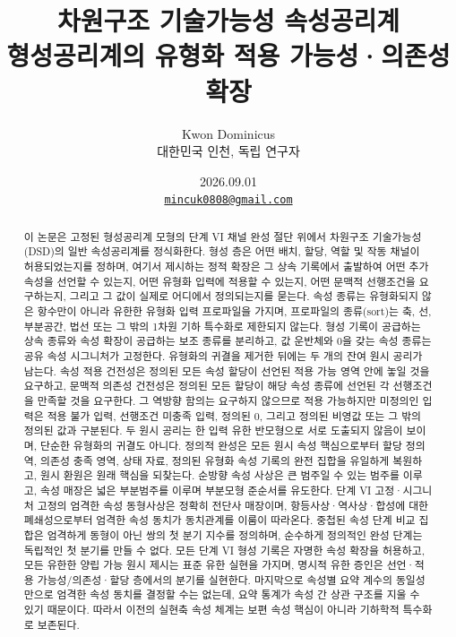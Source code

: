 \documentclass[11pt]{article}
\title{차원구조 기술가능성 속성공리계\\[0.35em]
\large 형성공리계의 유형화 적용 가능성·의존성 확장}
\author{Kwon Dominicus\\\small 대한민국 인천, 독립 연구자}
\date{2026.09.01\\[0.4em]\small\href{mailto:mincuk0808@gmail.com}{\texttt{mincuk0808@gmail.com}}}
\theoremstyle{definition}
\theoremstyle{remark}
\begin{document}
\maketitle

\begin{abstract}
이 논문은 고정된 형성공리계 모형의 단계 VI 채널 완성 절단 위에서 차원구조 기술가능성(DSD)의 일반 속성공리계를 정식화한다.
형성 층은 어떤 배치, 할당, 역할 및 작동 채널이 허용되었는지를 정하며, 여기서 제시하는 정적 확장은 그 상속 기록에서 출발하여 어떤 추가 속성을 선언할 수 있는지, 어떤 유형화 입력에 적용할 수 있는지, 어떤 문맥적 선행조건을 요구하는지, 그리고 그 값이 실제로 어디에서 정의되는지를 묻는다.
속성 종류는 유형화되지 않은 항수만이 아니라 유한한 유형화 입력 프로파일을 가지며, 프로파일의 종류(sort)는 축, 선, 부분공간, 법선 또는 그 밖의 1차원 기하 특수화로 제한되지 않는다.
형성 기록이 공급하는 상속 종류와 속성 확장이 공급하는 보조 종류를 분리하고, 값 운반체와 0을 갖는 속성 종류는 공유 속성 시그니처가 고정한다.
유형화의 귀결을 제거한 뒤에는 두 개의 잔여 원시 공리가 남는다.
속성 적용 건전성은 정의된 모든 속성 할당이 선언된 적용 가능 영역 안에 놓일 것을 요구하고, 문맥적 의존성 건전성은 정의된 모든 할당이 해당 속성 종류에 선언된 각 선행조건을 만족할 것을 요구한다.
그 역방향 함의는 요구하지 않으므로 적용 가능하지만 미정의인 입력은 적용 불가 입력, 선행조건 미충족 입력, 정의된 0, 그리고 정의된 비영값 또는 그 밖의 정의된 값과 구분된다.
두 원시 공리는 한 입력 유한 반모형으로 서로 도출되지 않음이 보이며, 단순한 유형화의 귀결도 아니다.
정의적 완성은 모든 원시 속성 핵심으로부터 할당 정의역, 의존성 충족 영역, 상태 자료, 정의된 유형화 속성 기록의 완전 집합을 유일하게 복원하고, 원시 환원은 원래 핵심을 되찾는다.
순방향 속성 사상은 큰 범주일 수 있는 범주를 이루고, 속성 매장은 넓은 부분범주를 이루며 부분모형 준순서를 유도한다. 단계 VI 고정·시그니처 고정의 엄격한 속성 동형사상은 정확히 전단사 매장이며, 항등사상·역사상·합성에 대한 폐쇄성으로부터 엄격한 속성 동치가 동치관계를 이룸이 따라온다.
중첩된 속성 단계 비교 집합은 엄격하게 동형이 아닌 쌍의 첫 분기 지수를 정의하며, 순수하게 정의적인 완성 단계는 독립적인 첫 분기를 만들 수 없다.
모든 단계 VI 형성 기록은 자명한 속성 확장을 허용하고, 모든 유한한 양립 가능 원시 제시는 표준 유한 실현을 가지며, 명시적 유한 증인은 선언·적용 가능성/의존성·할당 층에서의 분기를 실현한다.
마지막으로 속성별 요약 계수의 동일성만으로 엄격한 속성 동치를 결정할 수는 없는데, 요약 통계가 속성 간 상관 구조를 지울 수 있기 때문이다.
따라서 이전의 실현축 속성 체계는 보편 속성 핵심이 아니라 기하학적 특수화로 보존된다.
\end{abstract}
\end{document}
